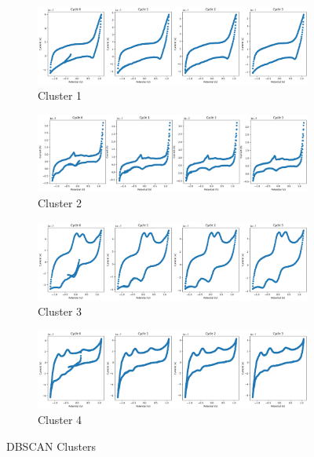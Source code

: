 \begin{figure}[h!]
  \centering
  	\begin{subfigure}{1.0\textwidth}
    \includegraphics[width=1.0\textwidth]{figures/dbscan_results.png}
    \caption{Cluster 1}
    \end{subfigure}
    
    \begin{subfigure}{1.0\textwidth}
    \includegraphics[width=1.0\textwidth]{figures/dbscan_results1.png}
    \caption{Cluster 2}
    \end{subfigure}
    
    \begin{subfigure}{1.0\textwidth}
    \includegraphics[width=1.0\textwidth]{figures/dbscan_results2.png}
    \caption{Cluster 3}
    \end{subfigure}
    
    \begin{subfigure}{1.0\textwidth}
    \includegraphics[width=1.0\textwidth]{figures/dbscan_results3.png}
    \caption{Cluster 4}
    \end{subfigure}
    
    \caption{DBSCAN Clusters}
    \label{dbscan_results}
\end{figure}
